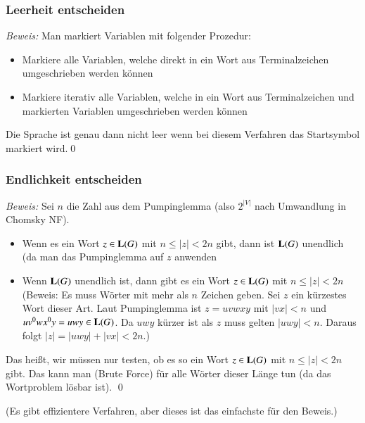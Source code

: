 \documentclass[aspectratio=1610,onlymath]{beamer}
\begin{document}
\begin{frame}\frametitle{Leerheit entscheiden}


\emph{Beweis:} Man markiert Variablen mit folgender Prozedur:
\begin{itemize}
\item Markiere alle Variablen, welche direkt in ein Wort aus Terminalzeichen umgeschrieben werden können
\item Markiere iterativ alle Variablen, welche in ein Wort aus Terminalzeichen und markierten Variablen umgeschrieben werden können
\end{itemize}
Die Sprache ist genau dann nicht leer wenn bei diesem Verfahren das Startsymbol markiert wird.\qed

\end{frame}

\begin{frame}\frametitle{Endlichkeit entscheiden}

\pause

\emph{Beweis:} Sei $n$ die Zahl aus dem Pumpinglemma (also $2^{|V|}$ nach Umwandlung in Chomsky NF).\pause
\begin{itemize}
\item Wenn es ein Wort $z\in\textbf{\textcolor{black}{L}}(G)$ mit $n\leq|z|<2n$ gibt, dann ist $\textbf{\textcolor{black}{L}}(G)$
unendlich (da man das Pumpinglemma auf $z$ anwenden  \pause
\item Wenn $\textbf{\textcolor{black}{L}}(G)$ unendlich ist, dann gibt es ein Wort $z\in\textbf{\textcolor{black}{L}}(G)$ mit $n\leq|z|<2n$ \pause
(Beweis: Es muss Wörter mit mehr als $n$ Zeichen geben. \pause Sei $z$ ein kürzestes Wort dieser Art. \pause
Laut Pumpinglemma ist $z=uvwxy$ mit $|vx|<n$ und $uv^0wx^0y=uwy\in\textbf{\textcolor{black}{L}}(G)$. \pause Da $uwy$ kürzer ist als $z$
muss gelten $|uwy|<n$. \pause Daraus folgt $|z|=|uwy|+|vx|<2n$.)\pause
\end{itemize}
Das heißt, wir müssen nur testen, ob es so ein Wort $z\in\textbf{\textcolor{black}{L}}(G)$ mit $n\leq|z|<2n$ gibt.
Das kann man (Brute Force) für alle Wörter dieser Länge tun (da das Wortproblem lösbar ist). \qed

{\tiny(Es gibt effizientere Verfahren, aber dieses ist das einfachste für den Beweis.)}

\end{frame}
\end{document}
